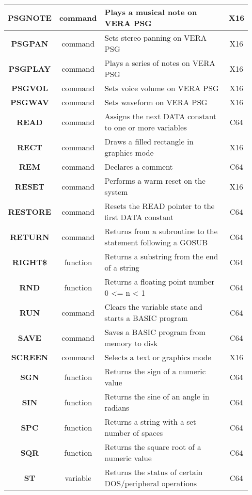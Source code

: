 \begin{longtable}{|c|c|m{4cm}|c|}
	{\bfseries PSGNOTE} & command & Plays a musical note on VERA PSG & X16 \\ \hline
	{\bfseries PSGPAN} & command & Sets stereo panning on VERA PSG & X16 \\ \hline
	{\bfseries PSGPLAY} & command & Plays a series of notes on VERA PSG & X16 \\ \hline
	{\bfseries PSGVOL} & command & Sets voice volume on VERA PSG & X16 \\ \hline
	{\bfseries PSGWAV} & command & Sets waveform on VERA PSG & X16 \\ \hline
	{\bfseries READ} & command & Assigns the next {\ttfamily DATA} constant to one or more variables & C64 \\ \hline
	{\bfseries RECT} & command & Draws a filled rectangle in graphics mode & X16 \\ \hline
	{\bfseries REM} & command & Declares a comment & C64 \\ \hline
	{\bfseries RESET} & command & Performs a warm reset on the system & X16 \\ \hline
	{\bfseries RESTORE} & command & Resets the {\ttfamily READ} pointer to the first {\ttfamily DATA} constant & C64 \\ \hline
	{\bfseries RETURN} & command & Returns from a subroutine to the statement following a GOSUB & C64 \\ \hline
	{\bfseries RIGHT\$} & function & Returns a substring from the end of a string & C64 \\ \hline
	{\bfseries RND} & function & Returns a floating point number 0 <= n < 1 & C64 \\ \hline
	{\bfseries RUN} & command & Clears the variable state and starts a BASIC program & C64 \\ \hline
	{\bfseries SAVE} & command & Saves a BASIC program from memory to disk & C64 \\ \hline
	{\bfseries SCREEN} & command & Selects a text or graphics mode & X16 \\ \hline
	{\bfseries SGN} & function & Returns the sign of a numeric value & C64 \\ \hline
	{\bfseries SIN} & function & Returns the sine of an angle in radians & C64 \\ \hline
	{\bfseries SPC} & function & Returns a string with a set number of spaces & C64 \\ \hline
	{\bfseries SQR} & function & Returns the square root of a numeric value & C64 \\ \hline
	{\bfseries ST} & variable & Returns the status of certain DOS/peripheral operations & C64 \\ \hline

\end{longtable}
